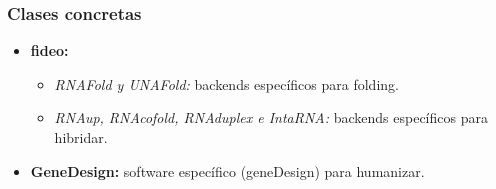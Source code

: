 \documentclass[12pt,a4paper,spanish]{article}
\begin{document}
\subsubsection{Clases concretas}
\begin{itemize}
    \item \textbf{fideo:}
        \begin{itemize}
            \item \emph{RNAFold y UNAFold:} backends específicos para folding.
            \item \emph{RNAup, RNAcofold, RNAduplex e IntaRNA:} backends específicos para hibridar.
        \end{itemize}
    \item \textbf{GeneDesign:} software específico (geneDesign) para humanizar.
\end{itemize}
\end{document}
